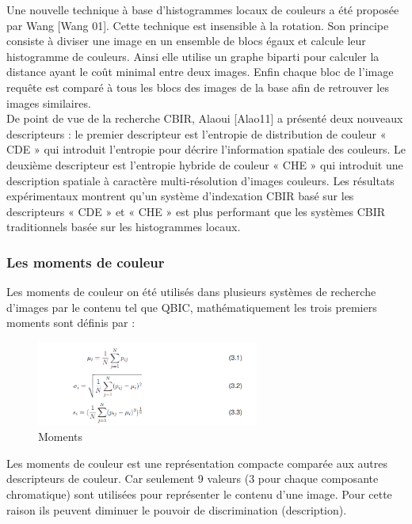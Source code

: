 Une nouvelle technique à base d'histogrammes locaux de couleurs a été proposée par Wang [Wang 01]. Cette technique est insensible à la rotation. Son principe consiste à diviser une image en un ensemble de blocs égaux et calcule leur histogramme de couleurs. Ainsi elle utilise un graphe biparti pour calculer la distance ayant le coût minimal entre deux images. Enfin chaque bloc de l'image requête est comparé à tous les blocs des images de la base afin de retrouver les images similaires.\\

De point de vue de la recherche CBIR, Alaoui [Alao11] a présenté deux nouveaux descripteurs : le premier descripteur est l’entropie de distribution de couleur « CDE » qui introduit l'entropie pour décrire l'information spatiale des couleurs. Le deuxième descripteur est l’entropie hybride de couleur « CHE » qui introduit une description spatiale à caractère multi-résolution d'images couleurs. Les résultats expérimentaux montrent qu'un système d'indexation CBIR basé sur les descripteurs « CDE » et « CHE » est plus performant que les systèmes CBIR traditionnels basée sur les histogrammes locaux.\\

\subsubsection{Les moments de couleur}
Les moments de couleur on été utilisés dans plusieurs systèmes de recherche d’images par le contenu tel que QBIC, mathématiquement les trois premiers moments sont définis par :
\begin{figure}[H]
	\label{fig:moments}
	\centering
	\includegraphics[width=0.65\textwidth]{Figures/moments} %
	\caption{Moments}
	
\end{figure}

Les moments de couleur est une représentation compacte comparée aux autres descripteurs de couleur. Car seulement 9 valeurs (3 pour chaque composante chromatique) sont utilisées pour représenter le contenu d’une image. Pour cette raison ils peuvent diminuer le pouvoir de discrimination (description). 

